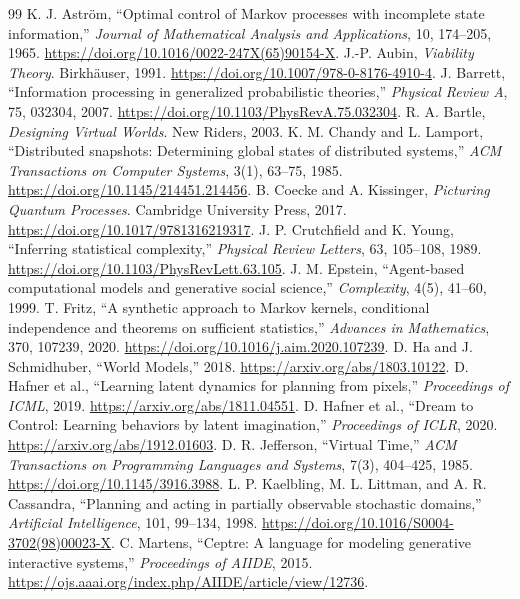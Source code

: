 \documentclass[11pt]{article}
\begin{document}
\begin{thebibliography}{99}\small
{} K. J. Astr\"om, ``Optimal control of Markov processes with incomplete state information,'' \emph{Journal of Mathematical Analysis and Applications}, 10, 174--205, 1965. \url{https://doi.org/10.1016/0022-247X(65)90154-X}.
 J.-P. Aubin, \emph{Viability Theory}. Birkh\"auser, 1991. \url{https://doi.org/10.1007/978-0-8176-4910-4}.
 J. Barrett, ``Information processing in generalized probabilistic theories,'' \emph{Physical Review A}, 75, 032304, 2007. \url{https://doi.org/10.1103/PhysRevA.75.032304}.
 R. A. Bartle, \emph{Designing Virtual Worlds}. New Riders, 2003.
 K. M. Chandy and L. Lamport, ``Distributed snapshots: Determining global states of distributed systems,'' \emph{ACM Transactions on Computer Systems}, 3(1), 63--75, 1985. \url{https://doi.org/10.1145/214451.214456}.
 B. Coecke and A. Kissinger, \emph{Picturing Quantum Processes}. Cambridge University Press, 2017. \url{https://doi.org/10.1017/9781316219317}.
 J. P. Crutchfield and K. Young, ``Inferring statistical complexity,'' \emph{Physical Review Letters}, 63, 105--108, 1989. \url{https://doi.org/10.1103/PhysRevLett.63.105}.
 J. M. Epstein, ``Agent-based computational models and generative social science,'' \emph{Complexity}, 4(5), 41--60, 1999.
 T. Fritz, ``A synthetic approach to Markov kernels, conditional independence and theorems on sufficient statistics,'' \emph{Advances in Mathematics}, 370, 107239, 2020. \url{https://doi.org/10.1016/j.aim.2020.107239}.
 D. Ha and J. Schmidhuber, ``World Models,'' 2018. \url{https://arxiv.org/abs/1803.10122}.
 D. Hafner et al., ``Learning latent dynamics for planning from pixels,'' \emph{Proceedings of ICML}, 2019. \url{https://arxiv.org/abs/1811.04551}.
 D. Hafner et al., ``Dream to Control: Learning behaviors by latent imagination,'' \emph{Proceedings of ICLR}, 2020. \url{https://arxiv.org/abs/1912.01603}.
 D. R. Jefferson, ``Virtual Time,'' \emph{ACM Transactions on Programming Languages and Systems}, 7(3), 404--425, 1985. \url{https://doi.org/10.1145/3916.3988}.
 L. P. Kaelbling, M. L. Littman, and A. R. Cassandra, ``Planning and acting in partially observable stochastic domains,'' \emph{Artificial Intelligence}, 101, 99--134, 1998. \url{https://doi.org/10.1016/S0004-3702(98)00023-X}.
 C. Martens, ``Ceptre: A language for modeling generative interactive systems,'' \emph{Proceedings of AIIDE}, 2015. \url{https://ojs.aaai.org/index.php/AIIDE/article/view/12736}.

\end{thebibliography}
\end{document}
